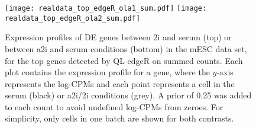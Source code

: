 \documentclass{article}
\begin{document}
\begin{figure}[p]
    \begin{center}
        \texttt{[image: realdata\_top\_edgeR\_ola1\_sum.pdf]}
        \texttt{[image: realdata\_top\_edgeR\_ola2\_sum.pdf]}
    \end{center}
\caption{
    Expression profiles of DE genes between 2i and serum (top) or between a2i and serum conditions (bottom) in the mESC data set, 
        for the top genes detected by QL edgeR on summed counts.
    Each plot contains the expression profile for a gene, where the $y$-axis represents the log-CPMs and each point represents a cell in the serum (black) or a2i/2i conditions (grey).
    A prior of 0.25 was added to each count to avoid undefined log-CPMs from zeroes.
    For simplicity, only cells in one batch are shown for both contrasts.
}
\label{fig:realdata}
\end{figure}

 
\end{document}
